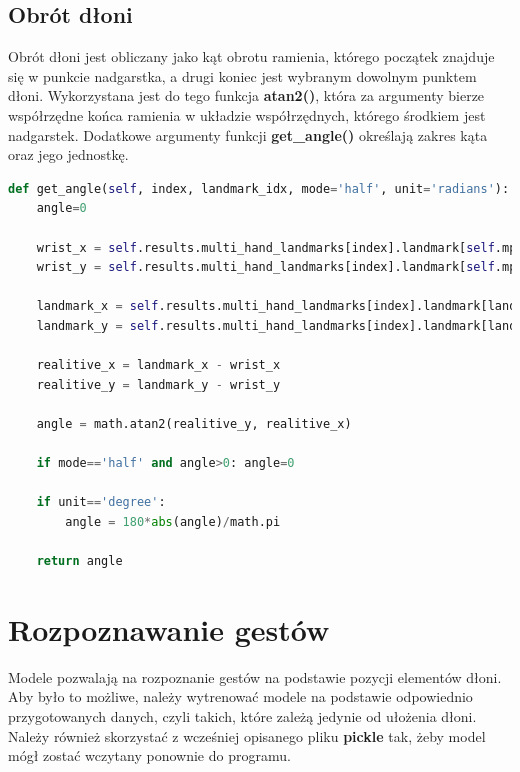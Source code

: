 \subsection{Obrót dłoni}

\quad Obrót dłoni jest obliczany jako kąt obrotu ramienia, którego początek znajduje się w punkcie nadgarstka, a drugi koniec jest wybranym dowolnym punktem dłoni. Wykorzystana jest do tego funkcja \textbf{atan2()}, która za argumenty bierze współrzędne końca ramienia w układzie współrzędnych, którego środkiem jest nadgarstek. Dodatkowe argumenty funkcji \textbf{get\_angle()} określają zakres kąta oraz jego jednostkę. \newline

\begin{lstlisting}[language=python, style=programming, captionpos=b, caption={Obliczenie odległości między wybrany punktami}]
def get_angle(self, index, landmark_idx, mode='half', unit='radians'):
    angle=0

    wrist_x = self.results.multi_hand_landmarks[index].landmark[self.mp_hands.HandLandmark.WRIST].x
    wrist_y = self.results.multi_hand_landmarks[index].landmark[self.mp_hands.HandLandmark.WRIST].y

    landmark_x = self.results.multi_hand_landmarks[index].landmark[landmark_idx].x
    landmark_y = self.results.multi_hand_landmarks[index].landmark[landmark_idx].y

    realitive_x = landmark_x - wrist_x
    realitive_y = landmark_y - wrist_y

    angle = math.atan2(realitive_y, realitive_x)

    if mode=='half' and angle>0: angle=0

    if unit=='degree':
        angle = 180*abs(angle)/math.pi

    return angle

\end{lstlisting}


\section{Rozpoznawanie gestów}

\quad Modele pozwalają na rozpoznanie gestów na podstawie pozycji elementów dłoni. Aby było to możliwe, należy wytrenować modele na podstawie odpowiednio przygotowanych danych, czyli takich, które zależą jedynie od ułożenia dłoni. Należy również skorzystać z wcześniej opisanego pliku \textbf{pickle} tak, żeby model mógł zostać wczytany ponownie do programu. 
 
